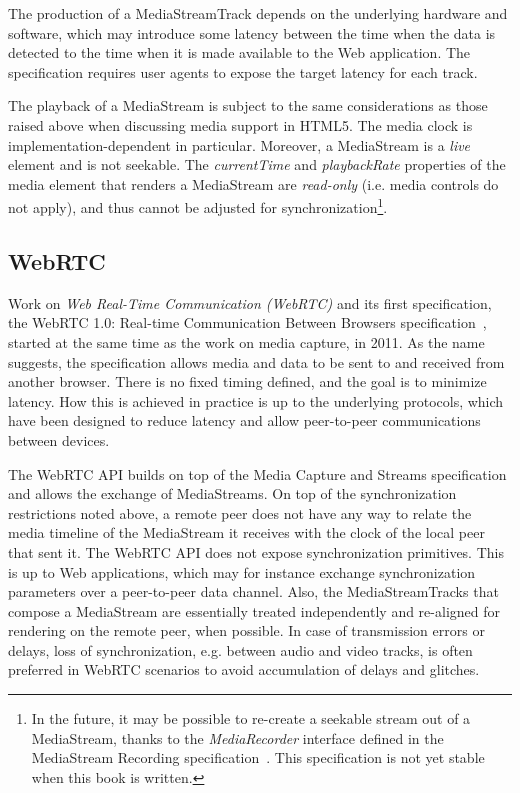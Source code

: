 The production of a MediaStreamTrack depends on the underlying hardware and
software, which may introduce some latency between the time when the data is
detected to the time when it is made available to the Web application. The
specification requires user agents to expose the target latency for each
track.

The playback of a MediaStream is subject to the same considerations as those
raised above when discussing media support in HTML5. The media clock is
implementation-dependent in particular. Moreover, a MediaStream is a
\emph{live} element and is not seekable. The \emph{currentTime} and
\emph{playbackRate} properties of the media element that renders a MediaStream
are \emph{read-only} (i.e. media controls do not apply), and thus cannot be
adjusted for synchronization\footnote{In the future, it may be possible to re-create 
a seekable stream out of a MediaStream, thanks to the
\emph{MediaRecorder} interface defined in the MediaStream Recording
specification~\cite{mediastreamrecording}. This specification is not yet stable when this book is
written.}.


\subsection{WebRTC}
\label{sec:webrtc}

Work on \emph{Web Real-Time Communication (WebRTC)} and its first specification, 
the WebRTC 1.0: Real-time Communication Between Browsers
specification~\cite{webrtc}, started at the same time as the work on media
capture, in 2011. As the name suggests, the specification allows media and
data to be sent to and received from another browser. There is no fixed timing
defined, and the goal is to minimize latency. How this is achieved in practice
is up to the underlying protocols, which have been designed to reduce latency
and allow peer-to-peer communications between devices.

The WebRTC API builds on top of the Media Capture and Streams specification
and allows the exchange of MediaStreams. On top of the synchronization
restrictions noted above, a remote peer does not have any way to relate the
media timeline of the MediaStream it receives with the clock of the local
peer that sent it. The \mbox{WebRTC} API does not expose synchronization primitives.
This is up to Web applications, which may for instance exchange
synchronization parameters over a peer-to-peer data channel. Also, the
MediaStreamTracks that compose a MediaStream are essentially treated
independently and re-aligned for rendering on the remote peer, when possible.
In case of transmission errors or delays, loss of synchronization, e.g.
between audio and video tracks, is often preferred in WebRTC scenarios to
avoid accumulation of delays and glitches.


